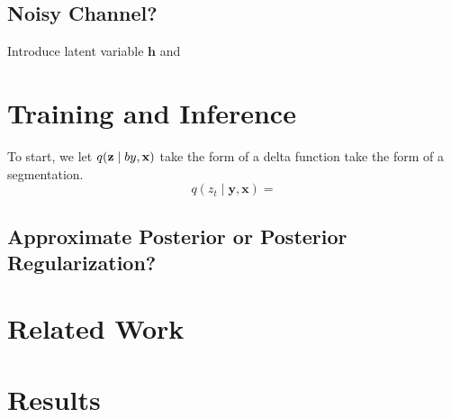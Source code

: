 \documentclass{article}
\newcommand{\bh}{\mathbf{h}}
\newcommand{\bx}{\mathbf{x}}
\newcommand{\by}{\mathbf{y}}
\newcommand{\bz}{\mathbf{z}}
\begin{document}
\subsection{Noisy Channel?}
Introduce latent variable $\bh$ and 

\section{Training and Inference}
To start, we let $q(\bz\mid\\by,\bx)$ take the form of a
delta function take the form of a segmentation.
$$q(z_t\mid\by,\bx)=$$
\subsection{Approximate Posterior or Posterior Regularization?}

\section{Related Work}

\section{Results}



\end{document}
